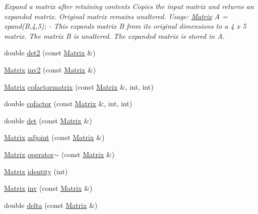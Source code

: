 \begin{DoxyCompactItemize}
\begin{DoxyCompactList}\small\item\em \-Expand a matrix after retaining contents \-Copies the input matrix and returns an expanded matrix. \-Original matrix remains unaltered. \-Usage\-: \hyperlink{classchittmatrix_1_1Matrix}{\-Matrix} \-A = xpand(\-B,4,5); -\/ \-This expands matrix \-B from its original dimensions to a 4 x 5 matrix. \-The matrix \-B is unaltered. \-The expanded matrix is stored in \-A. \end{DoxyCompactList}\item 
double \hyperlink{classchittmatrix_1_1Matrix_a8cc2f45639ddfa05bf093f2e28a2c7e6}{det2} (const \hyperlink{classchittmatrix_1_1Matrix}{\-Matrix} \&)
\item 
\hyperlink{classchittmatrix_1_1Matrix}{\-Matrix} \hyperlink{classchittmatrix_1_1Matrix_a7ac509f20af3840cbe434e7c4b207ddb}{inv2} (const \hyperlink{classchittmatrix_1_1Matrix}{\-Matrix} \&)
\item 
\hyperlink{classchittmatrix_1_1Matrix}{\-Matrix} \hyperlink{classchittmatrix_1_1Matrix_a61ad95a5122220b502feb2cb980f76b0}{cofactormatrix} (const \hyperlink{classchittmatrix_1_1Matrix}{\-Matrix} \&, int, int)
\item 
double \hyperlink{classchittmatrix_1_1Matrix_aca4074e1f1b7d1bee131f6ecee6c0f16}{cofactor} (const \hyperlink{classchittmatrix_1_1Matrix}{\-Matrix} \&, int, int)
\item 
double \hyperlink{classchittmatrix_1_1Matrix_a148f7362c35edea1dd649b9f25606a59}{det} (const \hyperlink{classchittmatrix_1_1Matrix}{\-Matrix} \&)
\item 
\hyperlink{classchittmatrix_1_1Matrix}{\-Matrix} \hyperlink{classchittmatrix_1_1Matrix_a7681a9d77c0781348d1c67a6c11705c5}{adjoint} (const \hyperlink{classchittmatrix_1_1Matrix}{\-Matrix} \&)
\item 
\hyperlink{classchittmatrix_1_1Matrix}{\-Matrix} \hyperlink{classchittmatrix_1_1Matrix_a803aafaddd1db4b9dd38ff26b8fb2b02}{operator$\sim$} (const \hyperlink{classchittmatrix_1_1Matrix}{\-Matrix} \&)
\item 
\hyperlink{classchittmatrix_1_1Matrix}{\-Matrix} \hyperlink{classchittmatrix_1_1Matrix_ad55b63026a70ff8140efaa2a842f7ef4}{identity} (int)
\item 
\hyperlink{classchittmatrix_1_1Matrix}{\-Matrix} \hyperlink{classchittmatrix_1_1Matrix_ad4b6b9be82b67da97999048dbcc6b028}{inv} (const \hyperlink{classchittmatrix_1_1Matrix}{\-Matrix} \&)
\item 
double \hyperlink{classchittmatrix_1_1Matrix_ae21a3e8414cc907f1c5781db0f05966a}{delta} (const \hyperlink{classchittmatrix_1_1Matrix}{\-Matrix} \&)

\end{DoxyCompactItemize}
